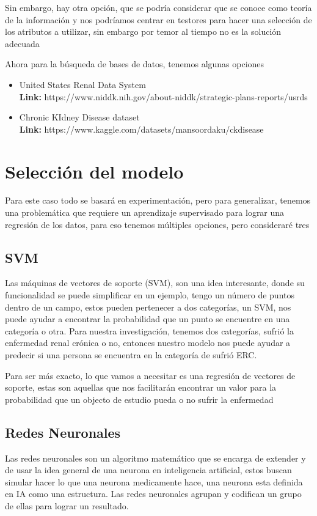 \documentclass{article}
\begin{document}
Sin embargo, hay otra opción, que se podría considerar que se conoce como
teoría de la información y nos podríamos centrar en testores para hacer una
selección de los atributos a utilizar, sin embargo por
temor al tiempo no es la solución adecuada \cite{inbook}

Ahora para la búsqueda de bases de datos, tenemos algunas opciones
\begin{itemize}
    \item United States Renal Data System\\
    \textbf{Link:} https://www.niddk.nih.gov/about-niddk/strategic-plans-reports/usrds
    \item Chronic KIdney Disease dataset\\
    \textbf{Link:} https://www.kaggle.com/datasets/mansoordaku/ckdisease
\end{itemize}

\section {Selección del modelo}
Para este caso todo se basará en experimentación, pero para generalizar,
tenemos una problemática que requiere un aprendizaje supervisado para lograr una
regresión de los datos, para eso tenemos múltiples opciones, pero consideraré
tres
\subsection{ SVM }
Las máquinas de vectores de soporte (SVM), son una idea interesante, donde su
funcionalidad se puede simplificar en un ejemplo, tengo un número de puntos
dentro de un campo, estos pueden pertenecer a dos categorías, un SVM, nos puede
ayudar a encontrar la probabilidad que un punto se encuentre en una categoría o
otra. Para nuestra investigación, tenemos dos categorías, sufrió la enfermedad
renal crónica o no, entonces nuestro modelo nos puede ayudar a predecir si una
persona se encuentra en la categoría de sufrió ERC.
\cite{steinwart2008support}

Para ser más exacto, lo que vamos a necesitar es una regresión de vectores de
soporte, estas son aquellas que nos facilitarán encontrar un valor para
la probabilidad que un objecto de estudio pueda o no sufrir la enfermedad

\subsection{ Redes Neuronales }
Las redes neuronales son un algoritmo matemático que se encarga de extender y de
usar la idea general de una neurona en inteligencia artificial, estos buscan
simular hacer lo que una neurona medicamente hace, una neurona esta definida en
IA como una estructura. Las redes neuronales agrupan y
codifican un grupo de ellas para lograr un resultado.
\end{document}

